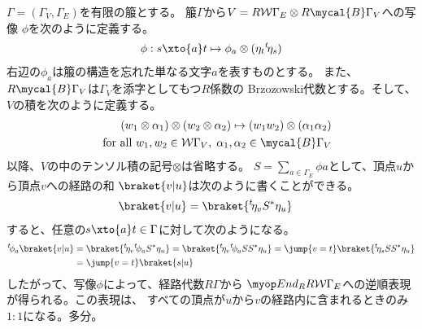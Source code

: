 	\begin{todo}[構成手順]\label{todo:構成手順} %
		\begin{description}\setlength{\itemsep}{-1mm} %
			\item[経路の和] $\Gamma=(\Gamma_V,\Gamma_E)$を有限の箙とする。
			箙$\Gamma$から$V=R\Word\Gamma_E\otimes R\mycal{B}\Gamma_V$への写像
			$\phi$を次のように定義する。
			\begin{equation*}\begin{split} %
				\phi: s \xto{a} t \mapsto \phi_a\otimes(\eta_t\lu{t}{\eta_s})
			\end{split}\end{equation*} %
			右辺の$\phi_a$は箙の構造を忘れた単なる文字$a$を表すものとする。
			また、$R\mycal{B}\Gamma_V$は$\Gamma_V$を添字としてもつ$R$係数の
			Brzozowski代数とする。そして、$V$の積を次のように定義する。
			\begin{equation*}\begin{split} %
				(w_1\otimes\alpha_1)\otimes(w_2\otimes\alpha_2)
					\mapsto (w_1w_2)\otimes(\alpha_1\alpha_2) \\
				\quad\text{for all }w_1,w_2\in\Word\Gamma_V
					,\;\alpha_1,\alpha_2\in\mycal{B}\Gamma_V
			\end{split}\end{equation*} %
			以降、$V$の中のテンソル積の記号$\otimes$は省略する。
			$S=\sum_{a\in\Gamma_E}\phi a$として、頂点$u$から頂点$v$への経路の和
			$\braket{v|u}$は次のように書くことができる。
			\begin{equation*}\begin{split} %
				\braket{v|u} &= \braket{\lu{t}{\eta_{v}}S^*\eta_{u}}
			\end{split}\end{equation*} %
			すると、任意の$s\xto{a}t\in\Gamma$に対して次のようになる。
			\begin{equation*}\begin{split} %
				\lu{t}{\phi_a}\braket{v|u}
				&= \braket{\lu{t}{\eta_{v}}\lu{t}{\phi_a}S^*\eta_{u}}
					= \braket{\lu{t}{\eta_{v}}\lu{t}{\phi_a}SS^*\eta_{u}}
					= \jump{v=t}\braket{\lu{t}{\eta_{s}}SS^*\eta_{u}} \\
				&= \jump{v=t}\braket{s|u} \\
			\end{split}\end{equation*} %
			したがって、写像$\phi$によって、経路代数$R\Gamma$から
			$\End_RR\Word\Gamma_E$への逆順表現が得られる。この表現は、
			すべての頂点が$u$から$v$の経路内に含まれるときのみ$1:1$になる。多分。
		\end{description} %
	\end{todo} %
%
